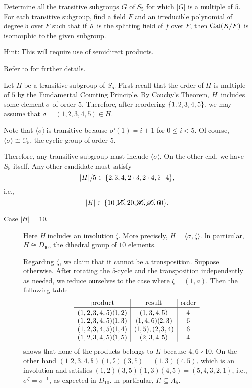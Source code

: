 \begin{probl}
    Determine all the transitive subgroups\/ $G$ of\/ $S_5$ for which\/ $|G|$ is a multiple of\/ $5$. For each transitive subgroup, find a field\/ $F$ and an irreducible polynomial of degree\/ $5$ over\/ $F$ such that if\/ $K$ is the splitting field of\/ $f$ over\/ $F$, then\/ $\operatorname{Gal}(K/F)$ is isomorphic to the given subgroup. 
    
    \textrm{\rm Hint: This will require use of semidirect products.}
\end{probl}

\begin{solution} Refer to \citep{LC} for further details.

    Let $H$ be a transitive subgroup of $S_5$. First recall that the order of $H$ is multiple of $5$ by the Fundamental Counting Principle. By Cauchy's Theorem, $H$~includes some element $\sigma$ of order $5$. Therefore, after reordering $\{1,2,3,4,5\}$, we may assume that $\sigma=(1,2,3,4,5)\in H$.
    
    Note that $\langle\sigma\rangle$ is transitive because $\sigma^i(1)=i+1$ for $0\le i<5$. Of course, $\langle\sigma\rangle\cong C_5$, the cyclic group of order $5$.

    Therefore, any transitive subgroup must include $\langle\sigma\rangle$. On the other end, we have $S_5$ itself. Any other candidate must satisfy
    $$
        |H|/5\in\{2,3,4,2\cdot3,2\cdot4,3\cdot4\},
    $$
    i.e.,
    $$
        |H| \in \{10,\cancel{15},20,\cancel{30},\cancel{40},60\}.
    $$
    \begin{description}
        \item[Case $|H|=10$.] Here $H$ includes an involution $\zeta$. More precisely, $H=\langle\sigma,\zeta\rangle$. In particular, $H\cong D_{10}$, the dihedral group of $10$ elements.
        
        Regarding $\zeta$, we claim that it cannot be a transposition. Suppose otherwise. After rotating the $5$-cycle and the transposition independently as needed, we reduce ourselves to the case where $\zeta=(1,a)$. Then the following table
        \begin{equation}\label{table:S5}
            \begin{array}{c|c|c}
                \text{product}&\text{result}&\text{order}\\
                \hline
                \vphantom{|^{|^|}}
                (1,2,3,4,5)(1,2)&(1,3,4,5)&4\\
                (1,2,3,4,5)(1,3)&(1,4,6)(2,3)&6\\
                (1,2,3,4,5)(1,4)&(1,5),(2,3,4)&6\\
                (1,2,3,4,5)(1,5)&(2,3,4,5)&4
            \end{array}
        \end{equation}
        shows that none of the products belongs to $H$ because $4,6\nmid10$. On the other hand $(1,2,3,4,5)(1,2)(3,5)=(1,3)(4,5)$, which is an involution and satisfies $(1,2)(3,5)(1,3)(4,5)=(5,4,3,2,1)$, i.e., $\sigma^\zeta=\sigma^{-1}$, as expected in $D_{10}$. In particular, $H\subseteq A_5$.


\end{description}
\end{solution}
